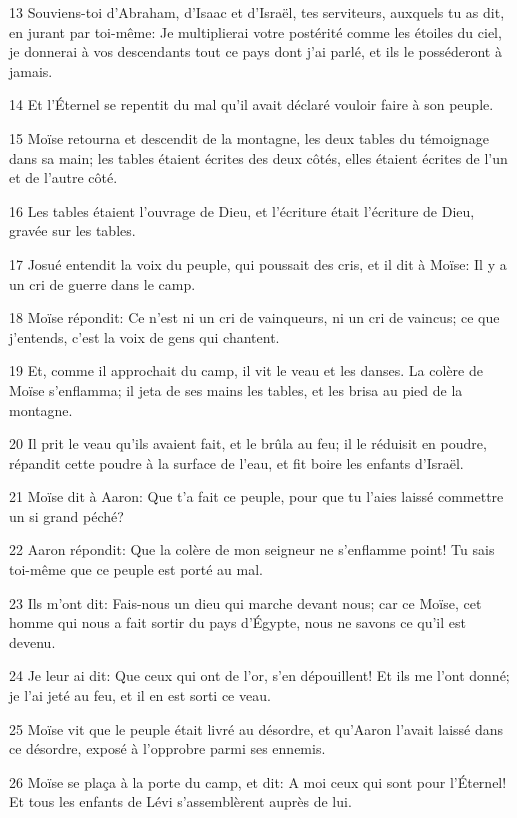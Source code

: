 \par 13 Souviens-toi d'Abraham, d'Isaac et d'Israël, tes serviteurs, auxquels tu as dit, en jurant par toi-même: Je multiplierai votre postérité comme les étoiles du ciel, je donnerai à vos descendants tout ce pays dont j'ai parlé, et ils le posséderont à jamais.
\par 14 Et l'Éternel se repentit du mal qu'il avait déclaré vouloir faire à son peuple.
\par 15 Moïse retourna et descendit de la montagne, les deux tables du témoignage dans sa main; les tables étaient écrites des deux côtés, elles étaient écrites de l'un et de l'autre côté.
\par 16 Les tables étaient l'ouvrage de Dieu, et l'écriture était l'écriture de Dieu, gravée sur les tables.
\par 17 Josué entendit la voix du peuple, qui poussait des cris, et il dit à Moïse: Il y a un cri de guerre dans le camp.
\par 18 Moïse répondit: Ce n'est ni un cri de vainqueurs, ni un cri de vaincus; ce que j'entends, c'est la voix de gens qui chantent.
\par 19 Et, comme il approchait du camp, il vit le veau et les danses. La colère de Moïse s'enflamma; il jeta de ses mains les tables, et les brisa au pied de la montagne.
\par 20 Il prit le veau qu'ils avaient fait, et le brûla au feu; il le réduisit en poudre, répandit cette poudre à la surface de l'eau, et fit boire les enfants d'Israël.
\par 21 Moïse dit à Aaron: Que t'a fait ce peuple, pour que tu l'aies laissé commettre un si grand péché?
\par 22 Aaron répondit: Que la colère de mon seigneur ne s'enflamme point! Tu sais toi-même que ce peuple est porté au mal.
\par 23 Ils m'ont dit: Fais-nous un dieu qui marche devant nous; car ce Moïse, cet homme qui nous a fait sortir du pays d'Égypte, nous ne savons ce qu'il est devenu.
\par 24 Je leur ai dit: Que ceux qui ont de l'or, s'en dépouillent! Et ils me l'ont donné; je l'ai jeté au feu, et il en est sorti ce veau.
\par 25 Moïse vit que le peuple était livré au désordre, et qu'Aaron l'avait laissé dans ce désordre, exposé à l'opprobre parmi ses ennemis.
\par 26 Moïse se plaça à la porte du camp, et dit: A moi ceux qui sont pour l'Éternel! Et tous les enfants de Lévi s'assemblèrent auprès de lui.

